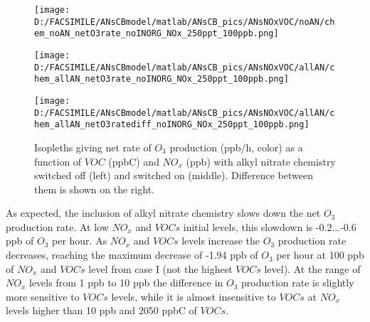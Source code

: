 \documentclass[11pt,a4paper]{article}
\begin{document}
\begin{figure} %
\centering
\begin{minipage}{.3\textwidth}
  \centering
  \texttt{[image: D:/FACSIMILE/ANsCBmodel/matlab/ANsCB\_pics/ANsNOxVOC/noAN/chem\_noAN\_netO3rate\_noINORG\_NOx\_250ppt\_100ppb.png]}
\end{minipage}
\begin{minipage}{.3\textwidth}
  \centering
  \texttt{[image: D:/FACSIMILE/ANsCBmodel/matlab/ANsCB\_pics/ANsNOxVOC/allAN/chem\_allAN\_netO3rate\_noINORG\_NOx\_250ppt\_100ppb.png]}
\end{minipage}
\begin{minipage}{.3\textwidth}
  \centering
  \texttt{[image: D:/FACSIMILE/ANsCBmodel/matlab/ANsCB\_pics/ANsNOxVOC/allAN/chem\_allAN\_netO3ratediff\_noINORG\_NOx\_250ppt\_100ppb.png]}
\end{minipage}
\caption{Isopleths giving net rate of $O_3$ production (ppb/h, color) as a function of $VOC$ (ppbC) and $NO_x$ (ppb) with alkyl nitrate chemistry switched off (left) and switched on (middle). Difference between them is shown on the right.}\label{fig:netO3rate_noAN_withAN_diff}
\end{figure}

As expected, the inclusion of alkyl nitrate chemistry slows down the net $O_3$ production rate. At low $NO_x$ and $VOCs$ initial levels, this slowdown is -0.2...-0.6 ppb of $O_3$ per hour. As $NO_x$ and $VOCs$ levels increase the $O_3$ production rate decreases, reaching the maximum decrease of -1.94 ppb of $O_3$ per hour at 100 ppb of $NO_x$ and $VOCs$ level from case I (not the highest $VOCs$ level). At the range of $NO_x$ levels from 1 ppb to 10 ppb the difference in $O_3$ production rate is slightly more sensitive to $VOCs$ levels, while it is almost insensitive to $VOCs$ at $NO_x$ levels higher than 10 ppb and 2050 ppbC of $VOCs$. 
\end{document}
